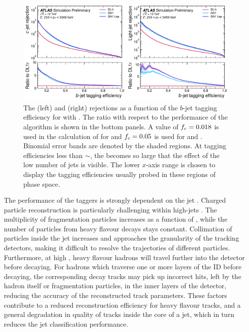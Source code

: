 \begin{figure}[!p]
    \centering
    \includegraphics[width=\textwidth]{chapters/gnn_tagger/figs/results/main/zprime/zprime_roc_btag.pdf}
    \caption{The \cjet (left) and \ljet (right) rejections as a function of the $b$-jet tagging efficiency for \Zprimejets with \Zprimept.
             The ratio with respect to the performance of the \DLr algorithm is shown in the bottom panels.
             A value of $f_c = 0.018$ is used in the calculation of \Db for \DLr and $f_c = 0.05$ is used for \GNN and \GNNLep.
             Binomial error bands are denoted by the shaded regions.
             At \bjet tagging efficiencies less than $\sim$, the \lrej becomes so large that the effect of the low number of jets is visible.
             The lower $x$-axis range is chosen to display the \bjet tagging efficiencies usually probed in these regions of phase space.}
    \label{fig:zprime_btag_roc}
\end{figure}

The performance of the taggers is strongly dependent on the jet \pt.
Charged particle reconstruction is particularly challenging within high-\pt jets \cite{PERF-2015-08}.
The multiplicity of fragmentation particles increases as a function of \pt, while the number of particles from heavy flavour decays stays constant.
Collimation of particles inside the jet increases and approaches the granularity of the tracking detectors, making it difficult to resolve the trajectories of different particles.
Furthermore, at high \pt, heavy flavour hadrons will travel further into the detector before decaying.
For hadrons which traverse one or more layers of the ID before decaying, the corresponding decay tracks may pick up incorrect hits, left by the hadron itself or fragmentation particles, in the inner layers of the detector, reducing the accuracy of the reconstructed track parameters.
These factors contribute to a reduced reconstruction efficiency for heavy flavour tracks, and a general degradation in quality of tracks inside the core of a jet, which in turn reduces the jet classification performance.

